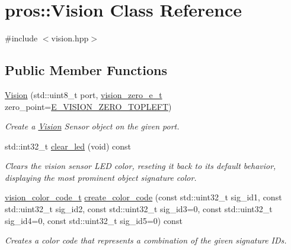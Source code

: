 \hypertarget{classpros_1_1Vision}{}\section{pros\+::Vision Class Reference}
\label{classpros_1_1Vision}


{\ttfamily \#include $<$vision.\+hpp$>$}

\subsection*{Public Member Functions}
\begin{DoxyCompactItemize}
\item 
\mbox{\hyperlink{classpros_1_1Vision_a46cdaf74713f630b5bb5f4d0d3259dcd}{Vision}} (std\+::uint8\+\_\+t port, \mbox{\hyperlink{vision_8h_a2e8bc1c48f8aab12275bfc1868fbbad6}{vision\+\_\+zero\+\_\+e\+\_\+t}} zero\+\_\+point=\mbox{\hyperlink{vision_8h_aef7c8269b3fb0dfbf4e597b2d8dd7af5a0ff244c5f3e9771f962986e25b00ff3d}{E\+\_\+\+V\+I\+S\+I\+O\+N\+\_\+\+Z\+E\+R\+O\+\_\+\+T\+O\+P\+L\+E\+FT}})
\begin{DoxyCompactList}\small\item\em Create a \mbox{\hyperlink{classpros_1_1Vision}{Vision}} Sensor object on the given port. \end{DoxyCompactList}\item 
std\+::int32\+\_\+t \mbox{\hyperlink{classpros_1_1Vision_a00f02cfb09ca224c2a7735be918e941d}{clear\+\_\+led}} (void) const
\begin{DoxyCompactList}\small\item\em Clears the vision sensor L\+ED color, reseting it back to its default behavior, displaying the most prominent object signature color. \end{DoxyCompactList}\item 
\mbox{\hyperlink{vision_8h_a71f2011a47e95558bb534b05c16c7f2b}{vision\+\_\+color\+\_\+code\+\_\+t}} \mbox{\hyperlink{classpros_1_1Vision_ab50bcfb700b591e2f1654962baac400f}{create\+\_\+color\+\_\+code}} (const std\+::uint32\+\_\+t sig\+\_\+id1, const std\+::uint32\+\_\+t sig\+\_\+id2, const std\+::uint32\+\_\+t sig\+\_\+id3=0, const std\+::uint32\+\_\+t sig\+\_\+id4=0, const std\+::uint32\+\_\+t sig\+\_\+id5=0) const
\begin{DoxyCompactList}\small\item\em Creates a color code that represents a combination of the given signature I\+Ds. \end{DoxyCompactList}\item 

\end{DoxyCompactItemize}
